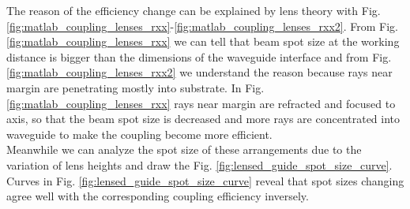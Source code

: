 The reason of the efficiency change can be explained by lens theory with Fig.  \ref{fig:matlab_coupling_lenses_rxx}-\ref{fig:matlab_coupling_lenses_rxx2}. From Fig. \ref{fig:matlab_coupling_lenses_rxx} we can tell that beam spot size at the working distance is bigger than the dimensions of the waveguide interface and from Fig. \ref{fig:matlab_coupling_lenses_rxx2} we understand the reason because rays near margin are penetrating mostly into substrate. In Fig. \ref{fig:matlab_coupling_lenses_rxx} rays near margin are refracted and focused to axis, so that the beam spot size is decreased and more rays are concentrated into waveguide to make the coupling become more efficient.\\   
Meanwhile we can analyze the spot size of these arrangements due to the variation of lens heights and draw the Fig. \ref{fig:lensed_guide_spot_size_curve}. Curves in Fig. \ref{fig:lensed_guide_spot_size_curve} reveal that spot sizes changing agree well with the corresponding coupling efficiency inversely.
